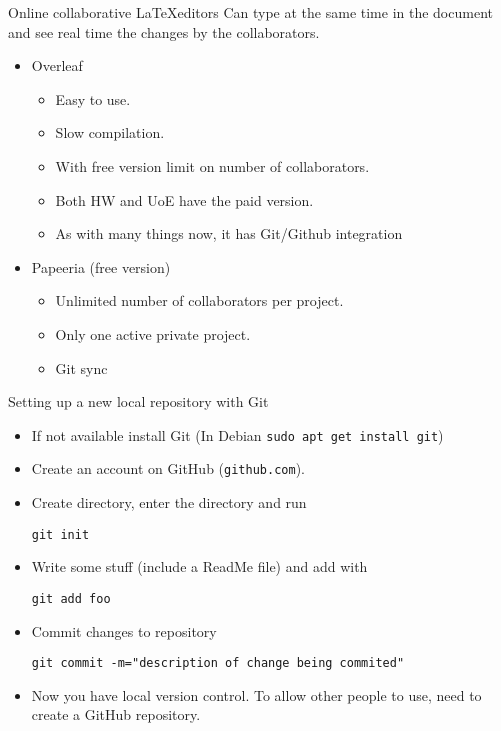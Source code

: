 \documentclass{beamer}
\begin{document}
\begin{frame}{Online collaborative \LaTeX editors}
 Can type at the same time in the document and see real time the changes by the collaborators.

  \begin{itemize}
  \item Overleaf
    \begin{itemize}
    \item Easy to use.
     \item Slow compilation.
    \item With free version limit on number of collaborators.
      \item Both HW and UoE have the paid version.
      \item As with many things now, it has Git/Github integration\pause
    \end{itemize}
\item Papeeria (free version)
  \begin{itemize}
  \item Unlimited number of collaborators per project.
  \item Only one active private project.
\item Git sync
    \end{itemize}
  \end{itemize}
\end{frame}

\begin{frame}{Setting up a new local repository with Git}
  \begin{itemize}
  \item If not available install Git (In Debian \texttt{sudo apt get install git})
\item Create an account on GitHub (\texttt{github.com}).
\item Create directory, enter the directory and run \\
  \begin{center}
    \texttt{git init}
  \end{center}
\item Write some stuff (include a ReadMe file) and add with \\
  \begin{center}    
\texttt{git add foo} 
  \end{center}
\item Commit changes to repository\\\begin{center} \texttt{git commit -m="description of change being commited"}\end{center}
\item Now you have local version control. To allow other people to use, need  to create a GitHub repository.
  \end{itemize}
 \end{frame}
\end{document}
